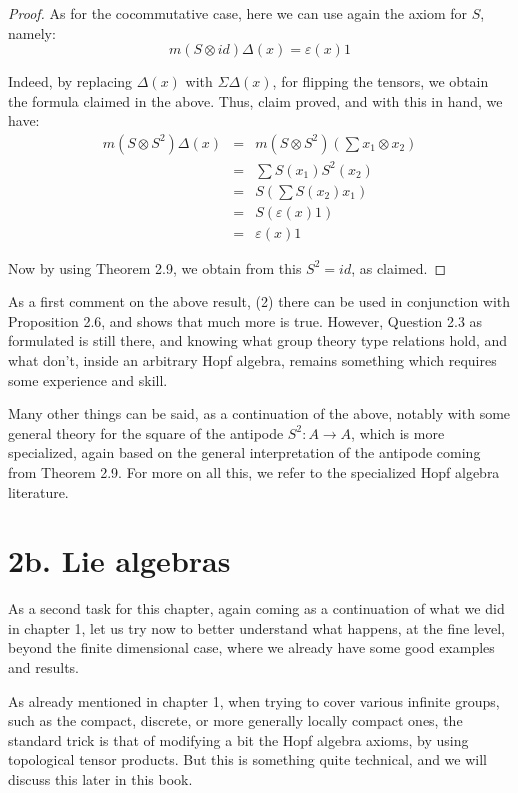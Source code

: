 \documentclass[12pt]{amsbook}
\begin{document}
\begin{proof}
As for the cocommutative case, here we can use again the axiom for $S$, namely:
$$m(S\otimes id)\Delta(x)=\varepsilon(x)1$$

Indeed, by replacing $\Delta(x)$ with $\Sigma\Delta(x)$, for flipping the tensors, we obtain the formula claimed in the above. Thus, claim proved, and with this in hand, we have:
\begin{eqnarray*}
m(S\otimes S^2)\Delta(x)
&=&m(S\otimes S^2)\left(\sum x_1\otimes x_2\right)\\
&=&\sum S(x_1)S^2(x_2)\\
&=&S\left(\sum S(x_2)x_1\right)\\
&=&S(\varepsilon(x)1)\\
&=&\varepsilon(x)1
\end{eqnarray*}

Now by using Theorem 2.9, we obtain from this $S^2=id$, as claimed.
\end{proof}

As a first comment on the above result, (2) there can be used in conjunction with Proposition 2.6, and shows that much more is true. However, Question 2.3 as formulated is still there, and knowing what group theory type relations hold, and what don't, inside an arbitrary Hopf algebra, remains something which requires some experience and skill.

\bigskip

Many other things can be said, as a continuation of the above, notably with some general theory for the square of the antipode $S^2:A\to A$, which is more specialized, again based on the general interpretation of the antipode coming from Theorem 2.9. For more on all this, we refer to the specialized Hopf algebra literature.

\section*{2b. Lie algebras}

As a second task for this chapter, again coming as a continuation of what we did in chapter 1, let us try now to better understand what happens, at the fine level, beyond the finite dimensional case, where we already have some good examples and results. 

\bigskip

As already mentioned in chapter 1, when trying to cover various infinite groups, such as the compact, discrete, or more generally locally compact ones, the standard trick is that of modifying a bit the Hopf algebra axioms, by using topological tensor products. But this is something quite technical, and we will discuss this later in this book. 
\end{document}
